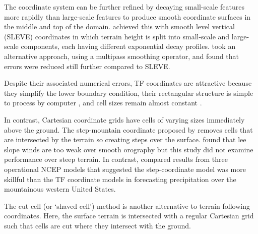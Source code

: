 The coordinate system can be further refined by decaying small-scale features more rapidly than large-scale features to produce smooth coordinate surfaces in the middle and top of the domain.  \cite{schaer2002} achieved this with smooth level vertical (SLEVE) coordinates in which terrain height is split into small-scale and large-scale components, each having different exponential decay profiles.  \cite{klemp2011} took an alternative approach, using a multipass smoothing operator, and found that errors were reduced still further compared to SLEVE.


Despite their associated numerical errors, TF coordinates are attractive because they simplify the lower boundary condition, their rectangular structure is simple to process by computer \autocite{schaer2002}, and cell sizes remain almost constant \autocite{jebens2011}.

In contrast, Cartesian coordinate grids have cells of varying sizes immediately above the ground.  The step-mountain coordinate proposed by \cite{mesinger1988} removes cells that are intersected by the terrain so creating steps over the surface.    \cite{gallus-klemp2000} found that lee slope winds are too weak over smooth orography but this study did not examine performance over steep terrain.  In contrast, \cite{mesinger2004} compared results from three operational NCEP models that suggested the step-coordinate model was more skillful than the TF coordinate models in forecasting precipitation over the mountainous western United States.

The cut cell (or `shaved cell')  method is another alternative to terrain following coordinates.  Here, the surface terrain is intersected with a regular Cartesian grid such that cells are cut where they intersect with the ground.  
